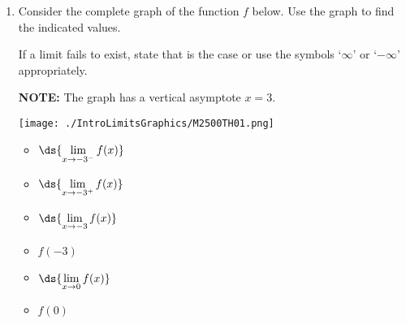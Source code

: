 \documentclass{ximera}
\begin{document}
	\author{Stitz-Zeager}



\label{ExercisesforIntroLimits}

\begin{enumerate}

\item  Consider the complete graph of the function $f$ below.  Use the graph to find the indicated values.

\smallskip

If a limit fails to exist, state that is the case  or use the symbols `$\infty$' or `$-\infty$' appropriately.
 
 \smallskip
 
 \textbf{NOTE:}  The graph has a vertical asymptote $x=3$.  

\begin{center}

\texttt{[image: ./IntroLimitsGraphics/M2500TH01.png]}

\end{center}

\bigskip

\begin{multicols}{4}

\begin{itemize}

\item $\ds{\lim_{x \rightarrow -3^{-}} f(x)}$

\item $\ds{\lim_{x \rightarrow -3^{+}} f(x)}$

\item $\ds{\lim_{x \rightarrow -3} f(x)}$

\item $f(-3)$

\end{itemize}

\end{multicols}

\bigskip

\begin{multicols}{4}

\begin{itemize}

\item $\ds{\lim_{x \rightarrow 0} f(x)}$

\item  $f(0)$


\end{itemize}
\end{multicols}
\end{enumerate}
\end{document}
